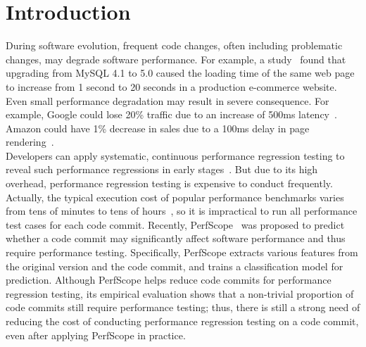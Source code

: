 \section{Introduction}
\label{sec:intro}
During software evolution, frequent code changes, often including problematic changes, may degrade software performance. For example, a study~\cite{huang2014performance} found that upgrading from MySQL 4.1 to 5.0 caused the loading time of the same web page to increase from 1 second to 20 seconds in a production e-commerce website. Even small performance degradation may result in severe consequence. For example, Google could lose 20\% traffic due to an increase of 500ms latency~\cite{Google}. Amazon could have 1\% decrease in sales due to a 100ms delay in page rendering~\cite{Stevefamov}. \\

Developers can apply systematic, continuous performance regression testing to reveal such performance regressions in early stages~\cite{foxref,poliniref,Ejref,MITCHELL,KALIBERA}. But due to its high overhead, performance regression testing is expensive to conduct frequently. Actually, the typical execution cost of popular performance benchmarks varies from tens of minutes to tens of hours~\cite{huang2014performance}, so it is impractical to run all performance test cases for each code commit. Recently, PerfScope~\cite{huang2014performance} was proposed to predict whether a code commit may significantly affect software performance and thus require performance testing. Specifically, PerfScope extracts various features from the original version and the code commit, and trains a classification model for prediction. Although PerfScope helps reduce code commits for performance regression testing, its empirical evaluation shows that a non-trivial proportion of code commits still require performance testing; thus, there is still a strong need of reducing the cost of conducting performance regression testing on a code commit, even after applying PerfScope in practice.\\



